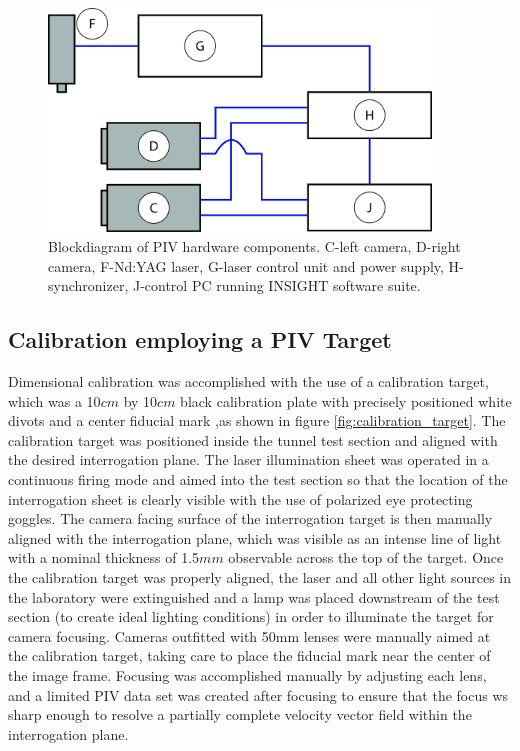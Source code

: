 \begin{figure}[H]
	\centering
	\includegraphics[width=4in]{figs/piv_method/experiment_block_diagram}
	\caption{Blockdiagram of PIV hardware components. C-left camera, D-right 
		camera, F-Nd:YAG laser, G-laser control unit and power supply, 
		H-synchronizer, 
		J-control PC running INSIGHT software suite.}
	\label{fig:pivblockdiagram}
\end{figure}

\subsection{Calibration employing a PIV Target}

Dimensional calibration was accomplished with the use of a calibration target, 
which was a 10$cm$ by 10$cm$ black calibration plate with precisely positioned 
white divots and a center fiducial mark ,as shown in figure 
\ref{fig:calibration_target}. The calibration target was positioned inside the 
tunnel test section and aligned with the desired interrogation plane. 
The laser illumination sheet was operated in a continuous firing mode and aimed 
into the test section so that the location of the interrogation sheet is 
clearly visible with the use of polarized eye protecting goggles. The camera 
facing surface of the 
interrogation target is then manually aligned with the interrogation plane, 
which was visible as an intense line of light with a nominal thickness of 
1.5$mm$ observable across the top of the target. Once the calibration target 
was properly aligned, the laser and all other light sources in the laboratory 
were extinguished and a lamp was placed downstream of the test section (to 
create ideal lighting conditions) in order to illuminate the target for camera 
focusing. Cameras outfitted with 50mm lenses were manually aimed at the 
calibration target, taking care to place the fiducial mark near the center of 
the image frame. Focusing was accomplished manually by adjusting each lens, and 
a limited PIV data set was created after focusing to ensure that the focus ws 
sharp enough to resolve a partially complete velocity vector field within the 
interrogation plane.


